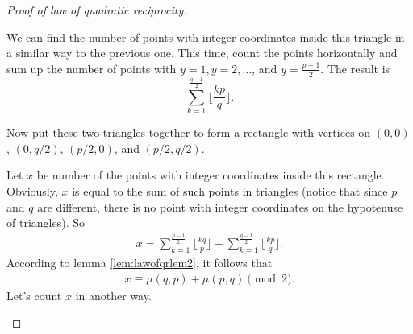 \documentclass{subfile}
\begin{document}
\begin{proof}[Proof of law of quadratic reciprocity]
\begin{center}
	\end{center}
	We can find the number of points with integer coordinates inside this triangle in a similar way to the previous one. This time, count the points horizontally and sum up the number of points with $y=1, y=2, \ldots$, and $y=\frac{p-1}{2}$. The result is \[ \sum_{k=1}^{\frac{q-1}{2}} \Big\lfloor\frac{kp}{q} \Big\rfloor.\]

	Now put these two triangles together to form a rectangle with vertices on $(0,0)$, $\left(0,q/2\right)$, $\left(p/2,0\right)$, and $\left(p/2,q/2\right)$.

	Let $x$ be number of the points with integer coordinates inside this rectangle. Obviously, $x$ is equal to the sum of such points in triangles (notice that since $p$ and $q$ are different, there is no point with integer coordinates on the hypotenuse of triangles). So
	\begin{align*}
	x = \sum_{k=1}^{\frac{p-1}{2}} \Big\lfloor\frac{kq}{p} \Big\rfloor+ \sum_{k=1}^{\frac{q-1}{2}} \Big\lfloor\frac{kp}{q} \Big\rfloor.
	\end{align*}
	According to lemma \eqref{lem:lawofqrlem2}, it follows that
	\begin{align}\label{eq:qrlawproof1}
	x \equiv \mu(q,p)+\mu(p,q) \pmod 2.
	\end{align}
	Let's count $x$ in another way.
	\begin{center}
\end{center}
\end{proof}
\end{document}
